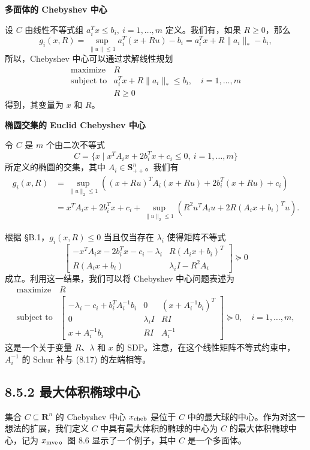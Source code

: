 \documentclass[UTF8, 12pt, fontset=fandol, oneside]{ctexart}
\begin{document}
\noindent\textbf{多面体的 Chebyshev 中心}

设 $C$ 由线性不等式组 $a_i^Tx\leq b_i,\ i=1,\ldots,m$ 定义。我们有，如果 $R\geq 0$，那么
\[
g_i(x,R)=\sup_{\|u\|\leq 1} a_i^T(x+Ru)-b_i
=a_i^Tx+R\|a_i\|_*-b_i,
\]
所以，Chebyshev 中心可以通过求解线性规划
\[
\begin{array}{ll}
\mbox{maximize} & R\\
\mbox{subject to} & a_i^Tx+R\|a_i\|_*\leq b_i,\quad i=1,\ldots,m\\
& R\geq 0
\end{array}
\]
得到，其变量为 $x$ 和 $R$。

\noindent\textbf{椭圆交集的 Euclid Chebyshev 中心}

令 $C$ 是 $m$ 个由二次不等式
\[
C=\{x\mid x^TA_ix+2b_i^Tx+c_i\leq 0,\ i=1,\ldots,m\}
\]
所定义的椭圆的交集，其中 $A_i\in\mathbf{S}_{++}^n$。我们有
\[
\begin{split}
g_i(x,R)
&=\sup_{\|u\|_2\leq 1}\left((x+Ru)^TA_i(x+Ru)+2b_i^T(x+Ru)+c_i\right)\\
&=x^TA_ix+2b_i^Tx+c_i
+\sup_{\|u\|_2\leq 1}\left(R^2u^TA_iu+2R(A_ix+b_i)^Tu\right).
\end{split}
\]

根据 \S B.1，$g_i(x,R)\leq 0$ 当且仅当存在 $\lambda_i$ 使得矩阵不等式
\[
\begin{bmatrix}
-x^TA_ix-2b_i^Tx-c_i-\lambda_i & R(A_ix+b_i)^T\\
R(A_ix+b_i) & \lambda_i I-R^2A_i
\end{bmatrix}\succeq 0
\tag{8.17}
\]
成立。利用这一结果，我们可以将 Chebyshev 中心问题表述为
\[
\begin{array}{ll}
\mbox{maximize} & R\\
\mbox{subject to} &
\begin{bmatrix}
-\lambda_i-c_i+b_i^TA_i^{-1}b_i & 0 & (x+A_i^{-1}b_i)^T\\
0 & \lambda_i I & RI\\
x+A_i^{-1}b_i & RI & A_i^{-1}
\end{bmatrix}\succeq 0,\quad i=1,\ldots,m,
\end{array}
\]
这是一个关于变量 $R$、$\lambda$ 和 $x$ 的 SDP。注意，在这个线性矩阵不等式约束中，$A_i^{-1}$ 的 Schur 补与 (8.17) 的左端相等。

\subsection*{8.5.2 最大体积椭球中心}

集合 $C\subseteq\mathbf{R}^n$ 的 Chebyshev 中心 $x_{\rm cheb}$ 是位于 $C$ 中的最大球的中心。作为对这一想法的扩展，我们定义 $C$ 中具有最大体积的椭球的中心为 $C$ 的最大体积椭球中心，记为 $x_{\rm mve}$。图 8.6 显示了一个例子，其中 $C$ 是一个多面体。
\end{document}
